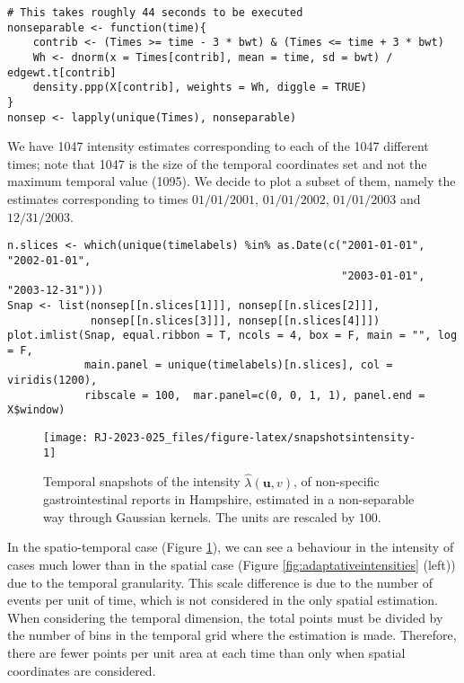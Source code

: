 \begin{verbatim}
# This takes roughly 44 seconds to be executed 
nonseparable <- function(time){
    contrib <- (Times >= time - 3 * bwt) & (Times <= time + 3 * bwt)
    Wh <- dnorm(x = Times[contrib], mean = time, sd = bwt) / edgewt.t[contrib]
    density.ppp(X[contrib], weights = Wh, diggle = TRUE)
}
nonsep <- lapply(unique(Times), nonseparable)
\end{verbatim}

We have 1047 intensity estimates corresponding to each of the 1047 different times; note that 1047 is the size of the temporal coordinates set and not the maximum temporal value (1095). We decide to plot a subset of them, namely the estimates corresponding to times \(01/01/2001\), \(01/01/2002\), \(01/01/2003\) and \(12/31/2003\).

\begin{verbatim}
n.slices <- which(unique(timelabels) %in% as.Date(c("2001-01-01", "2002-01-01", 
                                                    "2003-01-01", "2003-12-31")))
Snap <- list(nonsep[[n.slices[1]]], nonsep[[n.slices[2]]], 
             nonsep[[n.slices[3]]], nonsep[[n.slices[4]]])
plot.imlist(Snap, equal.ribbon = T, ncols = 4, box = F, main = "", log = F,
            main.panel = unique(timelabels)[n.slices], col = viridis(1200),
            ribscale = 100,  mar.panel=c(0, 0, 1, 1), panel.end = X$window)
\end{verbatim}

\begin{figure}

{\centering \texttt{[image: RJ-2023-025\_files/figure-latex/snapshotsintensity-1]} 

}

\caption{Temporal snapshots of the intensity $\hat{\lambda}(\mathbf{u},v)$, of non-specific gastrointestinal reports in Hampshire, estimated in a non-separable way through Gaussian kernels. The units are rescaled by $100$.}\label{fig:snapshotsintensity}
\end{figure}

In the spatio-temporal case (Figure \ref{fig:snapshotsintensity}), we can see a behaviour in the intensity of cases much lower than in the spatial case (Figure \ref{fig:adaptativeintensities} (left)) due to the temporal granularity. This scale difference is due to the number of events per unit of time, which is not considered in the only spatial estimation. When considering the temporal dimension, the total points must be divided by the number of bins in the temporal grid where the estimation is made. Therefore, there are fewer points per unit area at each time than only when spatial coordinates are considered.

